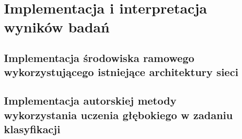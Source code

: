 \chapter{Implementacja i interpretacja wyników badań}

\section{Implementacja środowiska ramowego wykorzystującego istniejące architektury sieci}

\section{Implementacja autorskiej metody wykorzystania uczenia głębokiego w zadaniu klasyfikacji}